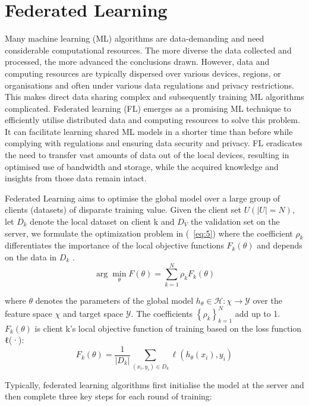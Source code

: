 \documentclass[withindex,glossary,firstyr]{cam-thesis}
\begin{document}
\section{Federated Learning}
Many machine learning (ML) algorithms are data-demanding and need considerable computational resources. The more diverse the data collected and processed, the more advanced the conclusions drawn. However, data and computing resources are typically dispersed over various devices, regions, or organisations and often under various data regulations and privacy restrictions. This makes direct data sharing complex and subsequently training ML algorithms complicated. Federated learning (FL) emerges as a promising ML technique to efficiently utilise distributed data and computing resources to solve this problem. It can facilitate learning shared ML models in a shorter time than before while complying with regulations and ensuring data security and privacy. FL eradicates the need to transfer vast amounts of data out of the local devices, resulting in optimised use of bandwidth and storage, while the acquired knowledge and insights from those data remain intact.

Federated Learning aims to optimise the global model over a large group of clients (datasets) of disparate training value. Given the client set $U(|U| = N)$, let $D_k$ denote the local dataset on client k and $D_V$ the validation set on the server, we formulate the optimization problem in (~\ref{eq:5}) where the coefficient $ρ_k$ differentiates the importance of the local objective functions $F_k(\theta)$ and depends on the data in $D_k$ . 
\begin{equation}
\arg \min _{\theta} F(\theta)=\sum_{k=1}^{N} \rho_{k} F_{k}(\theta)
\label{eq:5}
\end{equation}

where $\theta$ denotes the parameters of the global model \(h_{\theta} \in \mathcal{H}: \chi \rightarrow \mathcal{Y}\) over the feature space \(\chi\) and target space \(\mathcal{Y}\). The coefficients \(\left\{\rho_{k}\right\}_{k=1}^{N}\) add up to 1. \(F_{k}(\theta)\) is client k’s local objective function of training based on the loss function ℓ(·):
\begin{equation}
F_{k}(\theta)=\frac{1}{\left|D_{k}\right|} \sum_{\left(x_{i}, y_{i}\right) \in D_{k}} \ell\left(h_{\theta}\left(x_{i}\right), y_{i}\right)
\end{equation}

Typically, federated learning algorithms first initialise the model at the server and then complete three key steps for each round of training:
\end{document}
